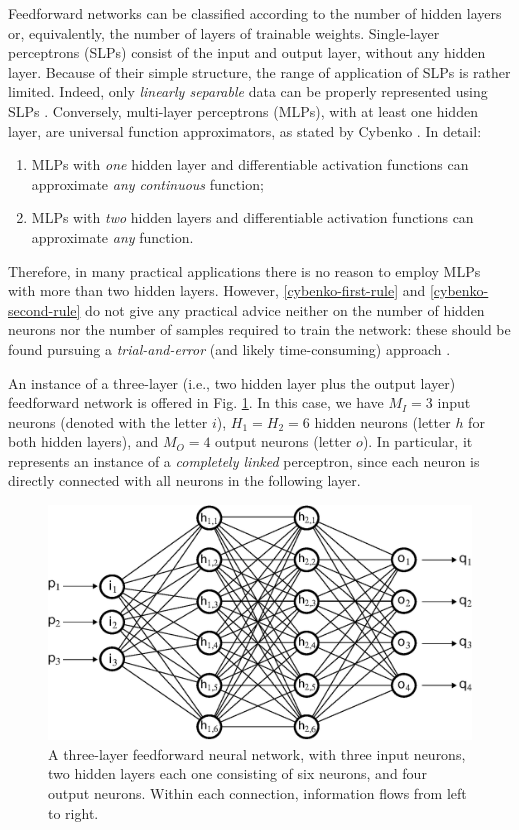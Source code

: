 \documentclass[longtitle]{elsarticle}
\numberwithin{equation}{section}
\theoremstyle{theorem}
\theoremstyle{definition}
\theoremstyle{remark}
\theoremstyle{proposition}
\numberwithin{figure}{section}
\begin{document}
		Feedforward networks can be classified according to the number of hidden layers or, equivalently, the number of layers of trainable weights. Single-layer perceptrons (SLPs) consist of the input and output layer, without any hidden layer. Because of their simple structure, the range of application of SLPs is rather limited. Indeed, only \emph{linearly separable} data can be properly represented using SLPs \cite{Kri07}. Conversely, multi-layer perceptrons (MLPs), with at least one hidden layer, are universal function approximators, as stated by Cybenko \cite{Cyb88, Cyb89}. In detail:
		\begin{enumerate}[label=(\roman*)]
			\item MLPs with \emph{one} hidden layer and differentiable activation functions can approximate \emph{any continuous} function; 
			\label{cybenko-first-rule}
			\item MLPs with \emph{two} hidden layers and differentiable activation functions can approximate \emph{any} function. 		
			\label{cybenko-second-rule}
		\end{enumerate}
		Therefore, in many practical applications there is no reason to employ MLPs with more than two hidden layers. However, \ref{cybenko-first-rule} and \ref{cybenko-second-rule} do not give any practical advice neither on the number of hidden neurons nor the number of samples required to train the network: these should be found pursuing a \emph{trial-and-error} (and likely time-consuming) approach \cite{Hag96}.
		
		An instance of a three-layer (i.e., two hidden layer plus the output layer) feedforward network is offered in Fig. \ref{fig:neural-network}. In this case, we have $M_I = 3$ input neurons (denoted with the letter $i$), $H_1 = H_2 = 6$ hidden neurons (letter $h$ for both hidden layers), and $M_O = 4$ output neurons (letter $o$). In particular, it represents an instance of a \emph{completely linked} perceptron, since each neuron is directly connected with all neurons in the following layer.
				
		\begin{figure}[t]
			\center
			\includegraphics[scale = 0.55]{neural_network.eps}
			
			\caption{A three-layer feedforward neural network, with three input neurons, two hidden layers each one consisting of six neurons, and four output neurons. Within each connection, information flows from left to right.}
			\label{fig:neural-network}
		\end{figure}
		
\end{document}
